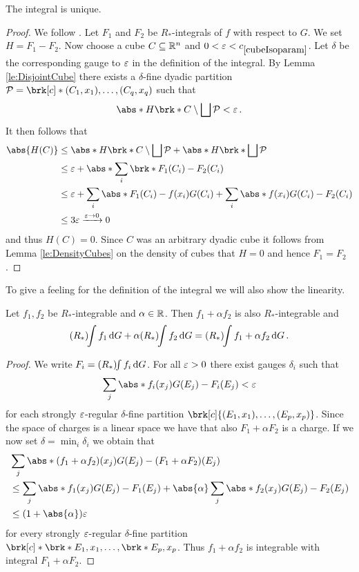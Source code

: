 \begin{claim}
The integral is unique.
\end{claim}
\begin{proof}
We follow \cite[Proposition 3.4]{Pfe2016}. Let $F_1$ and $F_2$ be $R_*$-integrals of $f$ with respect to $G$. We set $H=F_1-F_2$. Now choose a cube $C\subseteq \mathbb{R}^n$ and $0<\e<\useconstant{cubeIsoparam}$. Let $\delta$ be the corresponding gauge to $\varepsilon$ in the definition of the integral. By Lemma \ref{le:DisjointCube} there exists a $\delta$-fine dyadic partition $\cP=\brk[c]*{(C_1,x_1),\dots,(C_q,x_q)}$ such that
\begin{align*}
	\abs*{H\brk*{C\setminus \bigsqcup\cP}}<\e\,.
\end{align*}
It then follows that
\begin{align*}
	\abs{H(C)}
	&\leq \abs*{H\brk*{C\setminus \bigsqcup\cP}}+\abs*{H\brk*{\bigsqcup\cP}} \\
	&\leq\e+\abs*{\sum_i\brk*{F_1(C_i)-F_2(C_i)}} \\
	&\leq \e+\sum_i\abs*{F_1(C_i)-f(x_i)G(C_i)} +\sum_i\abs*{f(x_i)G(C_i)-F_2(C_i)} \\
	&\leq 3\e\xrightarrow{\e\to0}0
\end{align*}
and thus $H(C)=0$. Since $C$ was an arbitrary dyadic cube it follows from 
Lemma \ref{le:DensityCubes} on the density of cubes that $H=0$ and hence $F_1=F_2$.
\end{proof}

To give a feeling for the definition of the integral we will also show the linearity.

\begin{claim}
Let $f_1,f_2$ be $R_*$-integrable and $\alpha\in\mathbb{R}$. Then $f_1+\alpha f_2$ is also $R_*$-integrable and
\begin{align*}
	(R_*)\!\!\int f_1\,\mathrm{d} G + \alpha(R_*)\!\!\int f_2\,\mathrm{d} G=(R_*)\!\!\int f_1+\alpha f_2\,\mathrm{d} G\,.
\end{align*}
\end{claim}

\begin{proof}
We write $F_i=(R_*)\!\!\int f_i\,\mathrm{d} G$. For all $\varepsilon>0$ there exist gauges $\delta_i$ such that
\begin{align*}
	\sum_j\abs*{f_i(x_j)G(E_j)-F_i(E_j)}<\e
\end{align*}
for each strongly $\varepsilon$-regular $\delta$-fine partition $\brk[c]{(E_1,x_1),\dots,(E_p,x_p)}$. Since the space of charges is a linear space we have that also $F_1+\alpha F_2$ is a charge.
If we now set $\delta=\min_i\delta_i$ we obtain that
\begin{align*}
	&\sum_j\abs*{(f_1+\alpha f_2)(x_j)G(E_j)-(F_1+\alpha F_2)(E_j)} \\
	&\leq \sum_j\abs*{f_1(x_j)G(E_j)-F_1(E_j)}+\abs{\alpha}\sum_j\abs*{f_2(x_j)G(E_j)-F_2(E_j)} \\
	&\leq (1+\abs{\alpha})\e
\end{align*}
for every strongly $\varepsilon$-regular $\delta$-fine partition $\brk[c]*{\brk*{E_1,x_1},\dots,\brk*{E_p,x_p}}$. Thus $f_1+\alpha f_2$ is integrable with integral $F_1+\alpha F_2$.
\end{proof}


